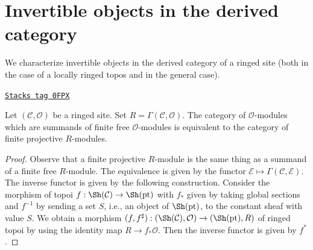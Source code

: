 \section{Invertible objects in the derived category}
\label{sites-cohomology-section-invertible-D-or-R}
We characterize invertible objects in the derived category of
a ringed site (both in the case of a locally ringed topos and
in the general case).

\begin{lemma}
\label{sites-cohomology-lemma-category-summands-finite-free}
\href{https://stacks.math.columbia.edu/tag/0FPX}{\texttt{Stacks tag 0FPX}}

Let $(\mathcal{C}, \mathcal{O})$ be a ringed site.
Set $R = \Gamma(\mathcal{C}, \mathcal{O})$. The category of
$\mathcal{O}$-modules which are summands of finite free
$\mathcal{O}$-modules is equivalent to the category of
finite projective $R$-modules.
\end{lemma}

\begin{proof}
Observe that a finite projective $R$-module is the same thing
as a summand of a finite free $R$-module.
The equivalence is given by the functor $\mathcal{E} \mapsto
\Gamma(\mathcal{C}, \mathcal{E})$.
The inverse functor is given by the following construction.
Consider the morphism of topoi $f : \Sh(\mathcal{C}) \to \Sh(\text{pt})$
with $f_*$ given by taking global sections and
$f^{-1}$ by sending a set $S$, i.e., an object of
$\Sh(\text{pt})$, to the constant sheaf with value $S$.
We obtain a morphism
$(f, f^\sharp) : (\Sh(\mathcal{C}), \mathcal{O}) \to (\Sh(\text{pt}), R)$
of ringed topoi by using the identity map $R \to f_*\mathcal{O}$.
Then the inverse functor is given by $f^*$.
\end{proof}

